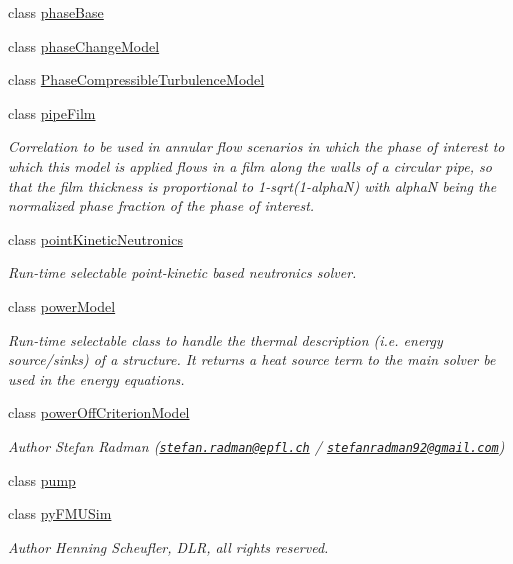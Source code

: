 \begin{DoxyCompactItemize}
class \hyperlink{classFoam_1_1phaseBase}{phase\+Base}
\item 
class \hyperlink{classFoam_1_1phaseChangeModel}{phase\+Change\+Model}
\item 
class \hyperlink{classFoam_1_1PhaseCompressibleTurbulenceModel}{Phase\+Compressible\+Turbulence\+Model}
\item 
class \hyperlink{classFoam_1_1pipeFilm}{pipe\+Film}
\begin{DoxyCompactList}\small\item\em Correlation to be used in annular flow scenarios in which the phase of interest to which this model is applied flows in a film along the walls of a circular pipe, so that the film thickness is proportional to 1-\/sqrt(1-\/alphaN) with alphaN being the normalized phase fraction of the phase of interest. \end{DoxyCompactList}\item 
class \hyperlink{classFoam_1_1pointKineticNeutronics}{point\+Kinetic\+Neutronics}
\begin{DoxyCompactList}\small\item\em Run-\/time selectable point-\/kinetic based neutronics solver. \end{DoxyCompactList}\item 
class \hyperlink{classFoam_1_1powerModel}{power\+Model}
\begin{DoxyCompactList}\small\item\em Run-\/time selectable class to handle the thermal description (i.\+e. energy source/sinks) of a structure. It returns a heat source term to the main solver be used in the energy equations. \end{DoxyCompactList}\item 
class \hyperlink{classFoam_1_1powerOffCriterionModel}{power\+Off\+Criterion\+Model}
\begin{DoxyCompactList}\small\item\em Author Stefan Radman (\href{mailto:stefan.radman@epfl.ch}{\tt stefan.\+radman@epfl.\+ch} / \href{mailto:stefanradman92@gmail.com}{\tt stefanradman92@gmail.\+com}) \end{DoxyCompactList}\item 
class \hyperlink{classFoam_1_1pump}{pump}
\item 
class \hyperlink{classFoam_1_1pyFMUSim}{py\+F\+M\+U\+Sim}
\begin{DoxyCompactList}\small\item\em Author Henning Scheufler, D\+LR, all rights reserved. \end{DoxyCompactList}\item 

\end{DoxyCompactItemize}
